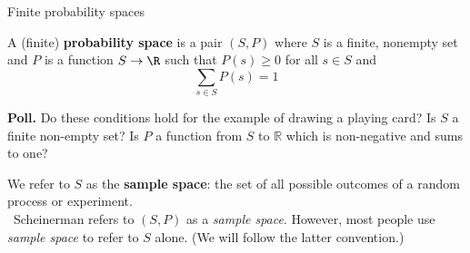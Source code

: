 \documentclass[10pt]{beamer}
\begin{document}
\begin{frame}{Finite probability spaces}
\small 
\begin{mygreenbox}[title=Definition]
A (finite) \textbf{probability space} is a pair $(S,P)$ where $S$ is a finite, nonempty set and $P$ is a function $S \to \R$ such that $P(s) \geq 0$ for all $s \in S$ and 
\[ \sum_{s \in S} P(s) =1 \] 
\end{mygreenbox}
\vfill 
\pause 
\vfill \vfill 
\colorbox{yellow!30}{\textbf{Poll.}} Do these conditions hold for the example of drawing a playing card? \pause 
\alert{Is $S$ a finite non-empty set?} \pause \greencheck  \pause \alert{Is $P$ a function from $S$ to $\mathbb{R}$ which is non-negative and sums to one?} \pause \greencheck 
\pause 
\vfill \vfill 

\begin{myredbox}[title=\text{Remark: What is a sample space?}]

We refer to $S$ as the \textbf{sample space}: the set of all possible outcomes of a random process or experiment. \\
\pause 
\vfill 
\faExclamationTriangle\ Scheinerman refers to $(S,P)$ as a \textit{sample space}.  However, most people  use \textit{sample space} to refer to $S$ alone.  (We will follow the latter convention.)
\end{myredbox}


%
%

\end{frame}
\end{document}
